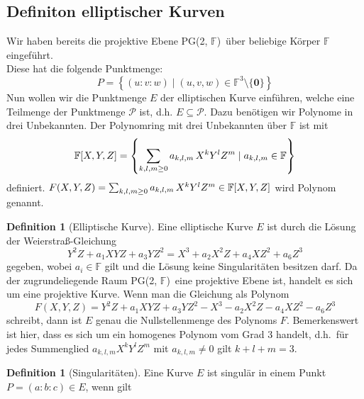 \documentclass[hidelinks]{article}
\theoremstyle{plain}
\theoremstyle{definition}
\newtheorem{defn}[thm]{Definition}
\theoremstyle{rem}
\newcommand{\pgtwo}{PG(2, $\mathbb{F}$)\ }
\newcommand{\ftnz}{\mathbb{F}^{3}\setminus\{\boldsymbol 0\}}
\begin{document}
\begin{sloppypar}
\subsection{Definiton elliptischer Kurven} \label{definition-ek}
Wir haben bereits die projektive Ebene \pgtwo über beliebige Körper $\mathbb{F}$ eingeführt.\\
Diese hat die folgende Punktmenge:
\begin{equation*}
    P = \left\{(u:v:w) \mid (u,v,w) \in \ftnz \right\}
\end{equation*}
Nun wollen wir die Punktmenge $E$ der elliptischen Kurve einführen, welche eine Teilmenge der Punktmenge $\mathcal{P}$ ist, d.h. $E \subseteq \mathcal{P}$. 
Dazu benötigen wir Polynome in drei Unbekannten.
Der Polynomring mit drei Unbekannten über $\mathbb{F}$ ist mit 
\begin{equation*}
    \mathbb{F}[X,Y,Z] = \left\{ \sum_{k,l,m \geq 0} a_{k,l,m} \thinspace X^k Y^l Z^m \mid a_{k,l,m} \in \mathbb{F} \right\}
\end{equation*}
definiert. 
$F(X,Y,Z) = \sum_{k,l,m \geq 0} a_{k,l,m} \thinspace X^k Y^l Z^m \in \mathbb{F}[X,Y,Z]$ wird Polynom genannt. 
\begin{defn}[Elliptische Kurve] \label{weierstrass}
    Eine elliptische Kurve $E$ ist durch die Lösung der Weierstraß-Gleichung 
    \begin{equation*}
        Y^2Z + a_1XYZ + a_3YZ^2 = X^3 + a_2X^2Z + a_4XZ^2 + a_6Z^3
    \end{equation*}
    gegeben, wobei $a_i \in \mathbb{F}$ gilt und die Lösung keine Singularitäten besitzen darf.\cite[Seite~54]{milne2006}
    Da der zugrundeliegende Raum \pgtwo eine projektive Ebene ist, handelt es sich um eine projektive Kurve. 
    Wenn man die Gleichung als Polynom 
    \begin{equation*}
        F(X,Y,Z) = Y^2Z + a_1XYZ + a_3YZ^2 - X^3 - a_2X^2Z - a_4XZ^2 -a_6Z^3
    \end{equation*}
    schreibt, dann ist $E$ genau die Nullstellenmenge des Polynoms $F$. Bemerkenswert ist hier, dass es sich um ein homogenes Polynom vom Grad 3 handelt, d.h.\ für jedes Summenglied $a_{k,l,m}X^kY^lZ^m$ mit $a_{k,l,m} \neq 0$ gilt $k + l + m = 3$.
\end{defn}
\begin{defn}[Singularitäten]
	Eine Kurve $E$ ist singulär in einem Punkt \mbox{$P=(a:b:c)\in E$}, wenn gilt
    \begin{equation*}

\end{equation*}
\end{defn}
\end{sloppypar}
\end{document}
